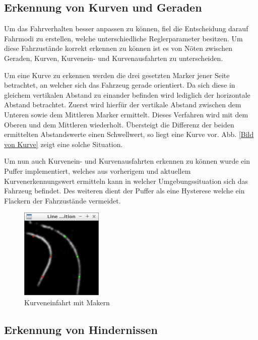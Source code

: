 \subsection{Erkennung von Kurven und Geraden}
\label{sec:kurvenerkennung}
Um das Fahrverhalten besser anpassen zu können, fiel die Entscheidung darauf Fahrmodi zu erstellen, welche unterschiedliche Reglerparameter besitzen. Um diese Fahrzustände korrekt erkennen zu können ist es von Nöten zwischen Geraden, Kurven, Kurvenein- und Kurvenausfahrten zu unterscheiden.

Um eine Kurve zu erkennen werden die drei gesetzten Marker jener Seite betrachtet, an welcher sich das Fahrzeug gerade orientiert. Da sich diese in gleichem vertikalen Abstand zu einander befinden wird lediglich der horizontale Abstand betrachtet. Zuerst wird hierfür der vertikale Abstand zwischen dem Unteren sowie dem Mittleren Marker ermittelt. Dieses Verfahren wird mit dem Oberen und dem Mittleren wiederholt. Übersteigt die Differenz der beiden ermittelten Abstandswerte einen Schwellwert, so liegt eine Kurve vor. Abb. \ref{Bild von Kurve} zeigt eine solche Situation.

Um nun auch Kurvenein- und Kurvenausfahrten erkennen zu können wurde ein Puffer implementiert, welches aus vorherigem und aktuellem Kurvenerkennungswert ermitteln kann in welcher Umgebungssituation sich das Fahrzeug befindet. Des weiteren dient der Puffer als eine Hysterese welche ein Flackern der Fahrzustände vermeidet.

\begin{figure}[ht]
	\centering
	\includegraphics[width=0.35\textwidth]{images/curve_bw.png}
	\caption{Kurveneinfahrt mit Makern}
\end{figure}
\label{Bild von Kurve}

\subsection{Erkennung von Hindernissen}
\label{sec:hinderniserkennung}

